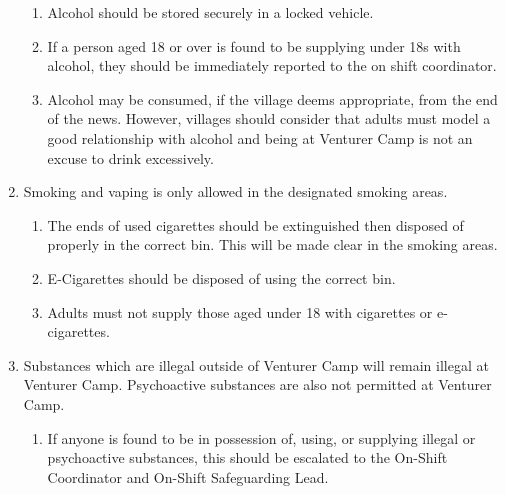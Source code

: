\documentclass[a4paper, 11pt]{report}
\def\enumMarginIndentOne{4em}
\begin{document}
\begin{enumerate}
\begin{enumerate}[leftmargin=\enumMarginIndentOne]
            \item Alcohol should be stored securely in a locked vehicle.
            \item If a person aged 18 or over is found to be supplying under 18s with alcohol, they should be immediately reported to the on shift coordinator.
            \item Alcohol may be consumed, if the village deems appropriate, from the end of the news. However, villages should consider that adults must model a good relationship with alcohol and being at Venturer Camp is not an excuse to drink excessively.
        \end{enumerate}
        \item Smoking and vaping is only allowed in the designated smoking areas.
        \begin{enumerate}[leftmargin=\enumMarginIndentOne]
            \item The ends of used cigarettes should be extinguished then disposed of properly in the correct bin. This will be made clear in the smoking areas.
            \item E-Cigarettes should be disposed of using the correct bin. 
            \item Adults must not supply those aged under 18 with cigarettes or e-cigarettes.
        \end{enumerate}
        \item Substances which are illegal outside of Venturer Camp will remain illegal at Venturer Camp. Psychoactive substances are also not permitted at Venturer Camp.
        \begin{enumerate}[leftmargin=\enumMarginIndentOne]
            \item If anyone is found to be in possession of, using, or supplying illegal or psychoactive substances, this should be escalated to the On-Shift Coordinator and On-Shift Safeguarding Lead. 
        \end{enumerate}
    \end{enumerate}
\end{document}
